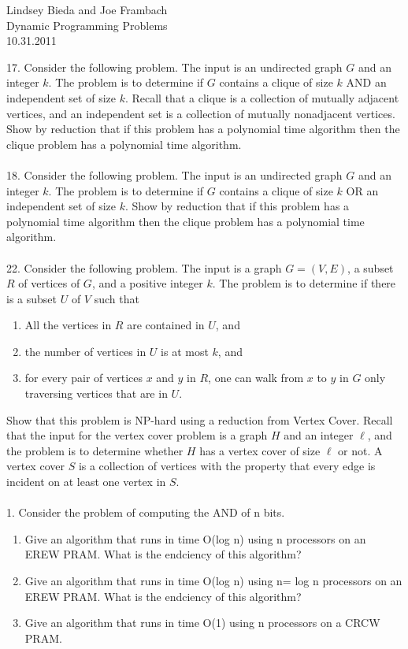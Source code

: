 \documentclass[10pt]{article}
\begin{document}
	\begin{flushright}
	Lindsey Bieda and Joe Frambach\\
	Dynamic Programming Problems\\
	10.31.2011
	\end{flushright}
17. Consider the following problem. The input is an undirected graph $G$ and an integer $k$. The problem
is to determine if $G$ contains a clique of size $k$ AND an independent set of size $k$. Recall that a
clique is a collection of mutually adjacent vertices, and an independent set is a collection of mutually
nonadjacent vertices. Show by reduction that if this problem has a polynomial time algorithm then
the clique problem has a polynomial time algorithm.
\\
\\
18. Consider the following problem. The input is an undirected graph $G$ and an integer $k$. The problem
is to determine if $G$ contains a clique of size $k$ OR an independent set of size $k$. Show by reduction
that if this problem has a polynomial time algorithm then the clique problem has a polynomial time
algorithm.
\\
\\
22. Consider the following problem. The input is a graph $G = (V, E)$, a subset $R$ of vertices of $G$, and a
positive integer $k$. The problem is to determine if there is a subset $U$ of $V$ such that
\begin{enumerate}
\item All the vertices in $R$ are contained in $U$, and
\item the number of vertices in $U$ is at most $k$, and
\item for every pair of vertices $x$ and $y$ in $R$, one can walk from $x$ to $y$ in $G$ only traversing vertices that
are in $U$.
\end{enumerate}
Show that this problem is NP-hard using a reduction from Vertex Cover. Recall that the input for the
vertex cover problem is a graph $H$ and an integer $\ell$, and the problem is to determine whether $H$ has a
vertex cover of size $\ell$ or not. A vertex cover $S$ is a collection of vertices with the property that every
edge is incident on at least one vertex in $S$.
	\\
\\
1. Consider the problem of computing the AND of n bits.
\begin{enumerate}
\item Give an algorithm that runs in time O(log n) using n processors on an EREW PRAM. What is
the endciency of this algorithm?
\item Give an algorithm that runs in time O(log n) using n= log n processors on an EREW PRAM.
What is the endciency of this algorithm?
\item Give an algorithm that runs in time O(1) using n processors on a CRCW PRAM.
\end{enumerate}
\end{document}
